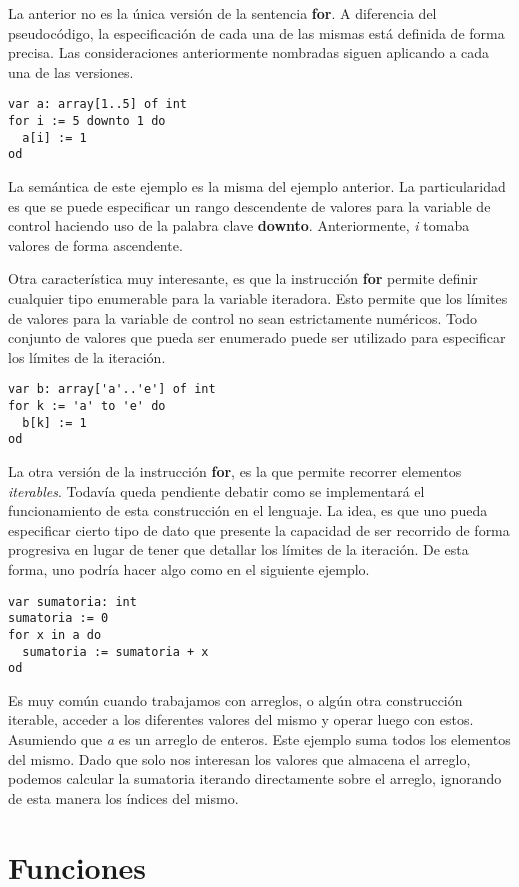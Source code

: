 \documentclass{article}
\begin{document}
La anterior no es la única versión de la sentencia \textbf{for}.
A diferencia del pseudocódigo, la especificación de cada una de las mismas está definida de forma precisa.
Las consideraciones anteriormente nombradas siguen aplicando a cada una de las versiones.
\begin{lstlisting}
var a: array[1..5] of int
for i := 5 downto 1 do
  a[i] := 1
od
\end{lstlisting}

La semántica de este ejemplo es la misma del ejemplo anterior.
La particularidad es que se puede especificar un rango descendente de valores para la variable de control haciendo uso de la palabra clave \textbf{downto}.
Anteriormente, \textit{i} tomaba valores de forma ascendente.

Otra característica muy interesante, es que la instrucción \textbf{for} permite definir cualquier tipo enumerable para la variable iteradora.
Esto permite que los límites de valores para la variable de control no sean estrictamente numéricos.
Todo conjunto de valores que pueda ser enumerado puede ser utilizado para especificar los límites de la iteración.
\begin{lstlisting}
var b: array['a'..'e'] of int
for k := 'a' to 'e' do
  b[k] := 1
od
\end{lstlisting}

La otra versión de la instrucción \textbf{for}, es la que permite recorrer elementos \textit{iterables}.
Todavía queda pendiente debatir como se implementará el funcionamiento de esta construcción en el lenguaje.
La idea, es que uno pueda especificar cierto tipo de dato que presente la capacidad de ser recorrido de forma progresiva en lugar de tener que detallar los límites de la iteración.
De esta forma, uno podría hacer algo como en el siguiente ejemplo.
\begin{lstlisting}
var sumatoria: int
sumatoria := 0
for x in a do
  sumatoria := sumatoria + x
od
\end{lstlisting}

Es muy común cuando trabajamos con arreglos, o algún otra construcción iterable, acceder a los diferentes valores del mismo y operar luego con estos.
Asumiendo que \textit{a} es un arreglo de enteros.
Este ejemplo suma todos los elementos del mismo.
Dado que solo nos interesan los valores que almacena el arreglo, podemos calcular la sumatoria iterando directamente sobre el arreglo, ignorando de esta manera los índices del mismo.

\section{Funciones}
\end{document}
